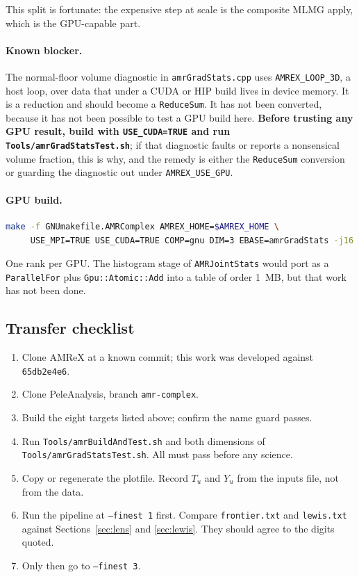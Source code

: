 \documentclass[11pt]{article}
\begin{document}
This split is fortunate: the expensive step at scale is the composite MLMG
apply, which is the GPU-capable part.

\paragraph{Known blocker.} The normal-floor volume diagnostic in
\texttt{amrGradStats.cpp} uses \texttt{AMREX\_LOOP\_3D}, a host loop, over
data that under a CUDA or HIP build lives in device memory. It is a
reduction and should become a \texttt{ReduceSum}. It has not been converted,
because it has not been possible to test a GPU build here. \textbf{Before
trusting any GPU result, build with \texttt{USE\_CUDA=TRUE} and run
\texttt{Tools/amrGradStatsTest.sh}}; if that diagnostic faults or reports a
nonsensical volume fraction, this is why, and the remedy is either the
\texttt{ReduceSum} conversion or guarding the diagnostic out under
\texttt{AMREX\_USE\_GPU}.

\paragraph{GPU build.}
\begin{lstlisting}[language=bash]
make -f GNUmakefile.AMRComplex AMREX_HOME=$AMREX_HOME \
     USE_MPI=TRUE USE_CUDA=TRUE COMP=gnu DIM=3 EBASE=amrGradStats -j16
\end{lstlisting}
One rank per GPU. The histogram stage of \texttt{AMRJointStats} would port as
a \texttt{ParallelFor} plus \texttt{Gpu::Atomic::Add} into a table of order
1~MB, but that work has not been done.

\subsection{Transfer checklist}

\begin{enumerate}
\item Clone AMReX at a known commit; this work was developed against
      \texttt{65db2e4e6}.
\item Clone PeleAnalysis, branch \texttt{amr-complex}.
\item Build the eight targets listed above; confirm the name guard passes.
\item Run \texttt{Tools/amrBuildAndTest.sh} and both dimensions of
      \texttt{Tools/amrGradStatsTest.sh}. All must pass before any science.
\item Copy or regenerate the plotfile. Record $T_u$ and $Y_u$ from the inputs
      file, not from the data.
\item Run the pipeline at \texttt{--finest 1} first. Compare
      \texttt{frontier.txt} and \texttt{lewis.txt} against
      Sections~\ref{sec:lens} and \ref{sec:lewis}. They should agree to the
      digits quoted.
\item Only then go to \texttt{--finest 3}.
\end{enumerate}
\end{document}
